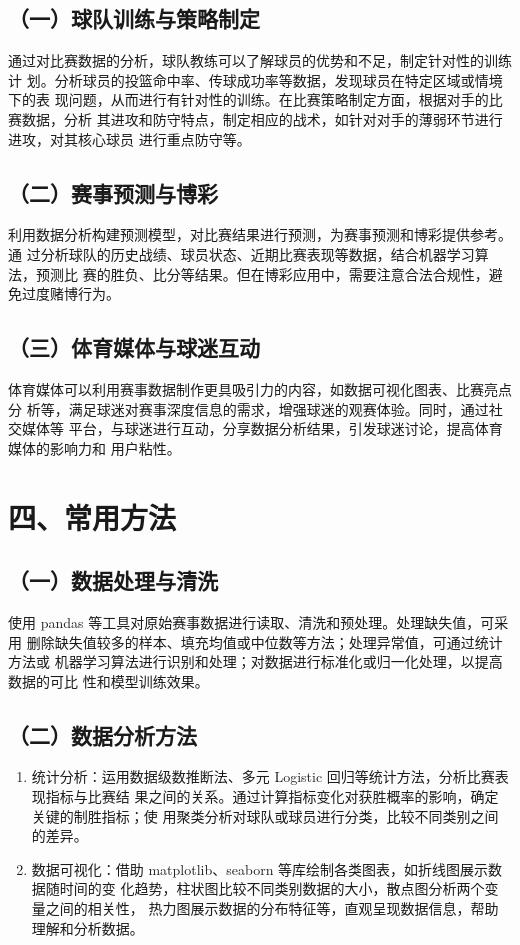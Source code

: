 \documentclass[UTF8]{ctexart}
\begin{document}
	\subsection*{（一）球队训练与策略制定}
	通过对比赛数据的分析，球队教练可以了解球员的优势和不足，制定针对性的训练计
	划。分析球员的投篮命中率、传球成功率等数据，发现球员在特定区域或情境下的表
	现问题，从而进行有针对性的训练。在比赛策略制定方面，根据对手的比赛数据，分析
	其进攻和防守特点，制定相应的战术，如针对对手的薄弱环节进行进攻，对其核心球员
	进行重点防守等。
	
	\subsection*{（二）赛事预测与博彩}
	利用数据分析构建预测模型，对比赛结果进行预测，为赛事预测和博彩提供参考。通
	过分析球队的历史战绩、球员状态、近期比赛表现等数据，结合机器学习算法，预测比
	赛的胜负、比分等结果。但在博彩应用中，需要注意合法合规性，避免过度赌博行为。
	
	\subsection*{（三）体育媒体与球迷互动}
	体育媒体可以利用赛事数据制作更具吸引力的内容，如数据可视化图表、比赛亮点分
	析等，满足球迷对赛事深度信息的需求，增强球迷的观赛体验。同时，通过社交媒体等
	平台，与球迷进行互动，分享数据分析结果，引发球迷讨论，提高体育媒体的影响力和
	用户粘性。
	
	\section*{四、常用方法}
	
	\subsection*{（一）数据处理与清洗}
	使用 pandas 等工具对原始赛事数据进行读取、清洗和预处理。处理缺失值，可采用
	删除缺失值较多的样本、填充均值或中位数等方法；处理异常值，可通过统计方法或
	机器学习算法进行识别和处理；对数据进行标准化或归一化处理，以提高数据的可比
	性和模型训练效果。
	
	\subsection*{（二）数据分析方法}
	\begin{enumerate}
		\item 统计分析：运用数据级数推断法、多元 Logistic 回归等统计方法，分析比赛表现指标与比赛结
		果之间的关系。通过计算指标变化对获胜概率的影响，确定关键的制胜指标；使
		用聚类分析对球队或球员进行分类，比较不同类别之间的差异。
		\item 数据可视化：借助 matplotlib、seaborn 等库绘制各类图表，如折线图展示数据随时间的变
		化趋势，柱状图比较不同类别数据的大小，散点图分析两个变量之间的相关性，
		热力图展示数据的分布特征等，直观呈现数据信息，帮助理解和分析数据。
	\end{enumerate}
	
\end{document}
